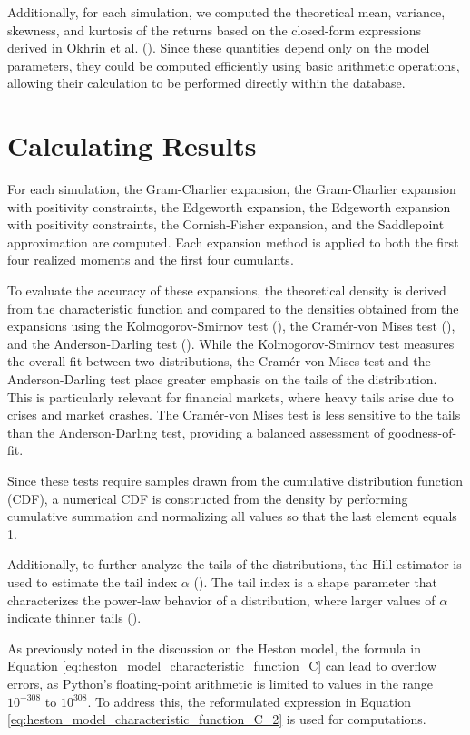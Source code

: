 Additionally, for each simulation, we computed the theoretical mean, variance, skewness, and kurtosis of the returns based on the closed-form expressions derived in Okhrin et al. (\citeyear{okhrinDistributionalPropertiesContinuous2023}). Since these quantities depend only on the model parameters, they could be computed efficiently using basic arithmetic operations, allowing their calculation to be performed directly within the database.

\section{Calculating Results}
For each simulation, the Gram-Charlier expansion, the Gram-Charlier expansion with positivity constraints, the Edgeworth expansion, the Edgeworth expansion with positivity constraints, the Cornish-Fisher expansion, and the Saddlepoint approximation are computed. Each expansion method is applied to both the first four realized moments and the first four cumulants.

To evaluate the accuracy of these expansions, the theoretical density is derived from the characteristic function and compared to the densities obtained from the expansions using the Kolmogorov-Smirnov test (\cite{kolmogorovSullaDeterminazioneEmpirica1993}), the Cramér-von Mises test (\cite{vonmisesWahrscheinlichkeitStatistikUnd1928, cramerCompositionElementaryErrors1928, andersonDistributionTwoSampleCramervon1962}), and the Anderson-Darling test (\cite{andersonTestGoodnessFit1954}). While the Kolmogorov-Smirnov test measures the overall fit between two distributions, the Cramér-von Mises test and the Anderson-Darling test place greater emphasis on the tails of the distribution. This is particularly relevant for financial markets, where heavy tails arise due to crises and market crashes. The Cramér-von Mises test is less sensitive to the tails than the Anderson-Darling test, providing a balanced assessment of goodness-of-fit.

Since these tests require samples drawn from the cumulative distribution function (CDF), a numerical CDF is constructed from the density by performing cumulative summation and normalizing all values so that the last element equals 1.

Additionally, to further analyze the tails of the distributions, the Hill estimator is used to estimate the tail index $\alpha$ (\cite{hillSimpleGeneralApproach1975}). The tail index is a shape parameter that characterizes the power-law behavior of a distribution, where larger values of $\alpha$ indicate thinner tails (\cite{fischlerAnswerDefinitionTailindex2017, danielssonTailIndexEstimation2016}).

As previously noted in the discussion on the Heston model, the formula in Equation \eqref{eq:heston_model_characteristic_function_C} can lead to overflow errors, as Python's floating-point arithmetic is limited to values in the range $10^{-308}$ to $10^{308}$. To address this, the reformulated expression in Equation \eqref{eq:heston_model_characteristic_function_C_2} is used for computations.
